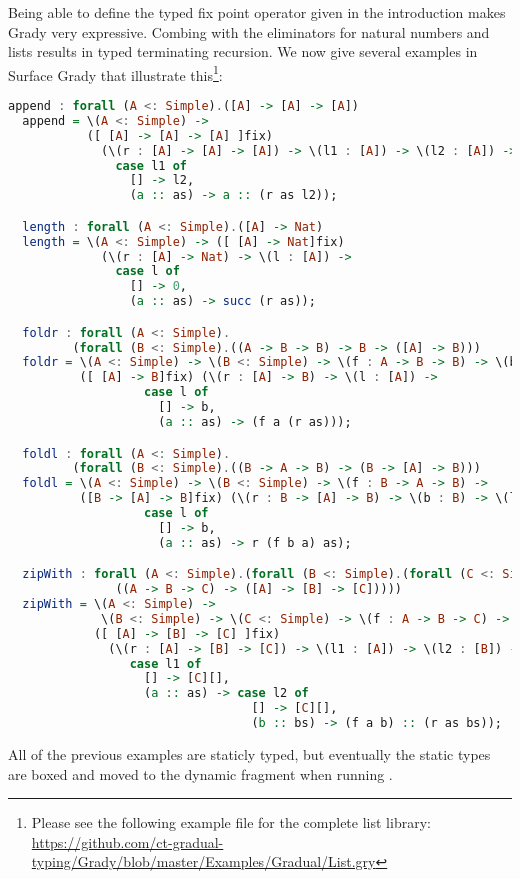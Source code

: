 Being able to define the typed fix point operator given in the
introduction makes Grady very expressive.  Combing  with
the eliminators for natural numbers and lists results in typed
terminating recursion.  We now give several examples in Surface Grady
that illustrate this\footnote{Please see the following example file for the complete list library: \url{https://github.com/ct-gradual-typing/Grady/blob/master/Examples/Gradual/List.gry}}:
\begin{lstlisting}[language=Haskell]
  append : forall (A <: Simple).([A] -> [A] -> [A])
  append = \(A <: Simple) ->
           ([ [A] -> [A] -> [A] ]fix)
             (\(r : [A] -> [A] -> [A]) -> \(l1 : [A]) -> \(l2 : [A]) ->
               case l1 of
                 [] -> l2,
                 (a :: as) -> a :: (r as l2));

  length : forall (A <: Simple).([A] -> Nat)
  length = \(A <: Simple) -> ([ [A] -> Nat]fix)
             (\(r : [A] -> Nat) -> \(l : [A]) ->
               case l of
                 [] -> 0,
                 (a :: as) -> succ (r as));

  foldr : forall (A <: Simple).
         (forall (B <: Simple).((A -> B -> B) -> B -> ([A] -> B)))
  foldr = \(A <: Simple) -> \(B <: Simple) -> \(f : A -> B -> B) -> \(b : B) ->
          ([ [A] -> B]fix) (\(r : [A] -> B) -> \(l : [A]) ->
                   case l of
                     [] -> b,
                     (a :: as) -> (f a (r as)));

  foldl : forall (A <: Simple).
         (forall (B <: Simple).((B -> A -> B) -> (B -> [A] -> B)))
  foldl = \(A <: Simple) -> \(B <: Simple) -> \(f : B -> A -> B) ->
          ([B -> [A] -> B]fix) (\(r : B -> [A] -> B) -> \(b : B) -> \(l : [A]) ->
                   case l of
                     [] -> b,
                     (a :: as) -> r (f b a) as);

  zipWith : forall (A <: Simple).(forall (B <: Simple).(forall (C <: Simple).
               ((A -> B -> C) -> ([A] -> [B] -> [C]))))
  zipWith = \(A <: Simple) ->
             \(B <: Simple) -> \(C <: Simple) -> \(f : A -> B -> C) ->
            ([ [A] -> [B] -> [C] ]fix)
              (\(r : [A] -> [B] -> [C]) -> \(l1 : [A]) -> \(l2 : [B]) ->
                 case l1 of
                   [] -> [C][],
                   (a :: as) -> case l2 of
                                  [] -> [C][],
                                  (b :: bs) -> (f a b) :: (r as bs));
\end{lstlisting}
All of the previous examples are staticly typed, but eventually the
static types are boxed and moved to the dynamic fragment when running
.
